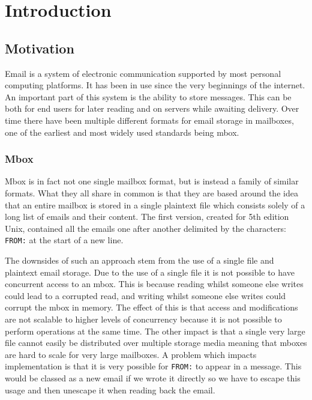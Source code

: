 \chapter{Introduction}

\section{Motivation}

Email is a system of electronic communication supported by most personal computing platforms. It has been in use since the very beginnings of the internet. An important part of this system is the ability to store messages. This can be both for end users for later reading and on servers while awaiting delivery. Over time there have been multiple different formats for email storage in mailboxes, one of the earliest and most widely used standards being mbox.

\subsection{Mbox}

Mbox is in fact not one single mailbox format, but is instead a family of similar formats. What they all share in common is that they are based around the idea that an entire mailbox is stored in a single plaintext file which consists solely of a long list of emails and their content. The first version, created for 5th edition Unix, contained all the emails one after another delimited by the characters: \texttt{FROM:} at the start of a new line.

The downsides of such an approach stem from the use of a single file and plaintext email storage. Due to the use of a single file it is not possible to have concurrent access to an mbox. This is because reading whilst someone else writes could lead to a corrupted read, and writing whilst someone else writes could corrupt the mbox in memory. The effect of this is that access and modifications are not scalable to higher levels of concurrency because it is not possible to perform operations at the same time. The other impact is that a single very large file cannot easily be distributed over multiple storage media meaning that mboxes are hard to scale for very large mailboxes. A problem which impacts implementation is that it is very possible for \texttt{FROM:} to appear in a message. This would be classed as a new email if we wrote it directly so we have to escape this usage and then unescape it when reading back the email.


